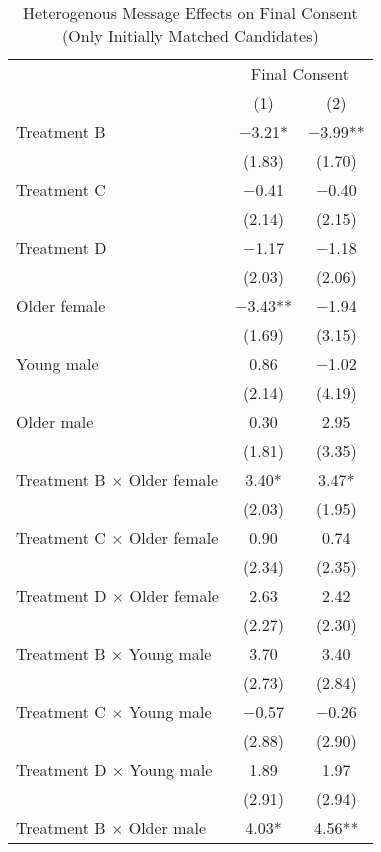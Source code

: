 \documentclass[12pt, a4paper]{article}
\begin{document}
\begin{table}[H]

\caption{\label{tab:lm-consent-interaction-init-reg}Heterogenous Message Effects on Final Consent (Only Initially Matched Candidates)}
\centering
\fontsize{8}{10}\selectfont
\begin{threeparttable}
\begin{tabular}[t]{lcc}
\toprule
\multicolumn{1}{c}{ } & \multicolumn{2}{c}{Final Consent} \\
\cmidrule(l{3pt}r{3pt}){2-3}
  & (1) & (2)\\
\midrule
Treatment B & \num{-3.21}* & \num{-3.99}**\\
 & (\num{1.83}) & (\num{1.70})\\
Treatment C & \num{-0.41} & \num{-0.40}\\
 & (\num{2.14}) & (\num{2.15})\\
Treatment D & \num{-1.17} & \num{-1.18}\\
 & (\num{2.03}) & (\num{2.06})\\
Older female & \num{-3.43}** & \num{-1.94}\\
 & (\num{1.69}) & (\num{3.15})\\
Young male & \num{0.86} & \num{-1.02}\\
 & (\num{2.14}) & (\num{4.19})\\
Older male & \num{0.30} & \num{2.95}\\
 & (\num{1.81}) & (\num{3.35})\\
Treatment B $\times$ Older female & \num{3.40}* & \num{3.47}*\\
 & (\num{2.03}) & (\num{1.95})\\
Treatment C $\times$ Older female & \num{0.90} & \num{0.74}\\
 & (\num{2.34}) & (\num{2.35})\\
Treatment D $\times$ Older female & \num{2.63} & \num{2.42}\\
 & (\num{2.27}) & (\num{2.30})\\
Treatment B $\times$ Young male & \num{3.70} & \num{3.40}\\
 & (\num{2.73}) & (\num{2.84})\\
Treatment C $\times$ Young male & \num{-0.57} & \num{-0.26}\\
 & (\num{2.88}) & (\num{2.90})\\
Treatment D $\times$ Young male & \num{1.89} & \num{1.97}\\
 & (\num{2.91}) & (\num{2.94})\\
Treatment B $\times$ Older male & \num{4.03}* & \num{4.56}**\\

\end{tabular}
\end{threeparttable}
\end{table}
\end{document}
